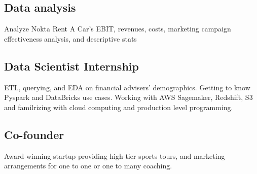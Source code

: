 \documentclass[letter,10pt]{article}
\begin{document}
\subsection{{Data analysis}}
\justify{}
\begin{zitemize}
\item Analyze Nokta Rent A Car's EBIT, revenues, costs, marketing campaign effectiveness analysis, and descriptive stats
\end{zitemize}

\vspace{10 pt}

\subsection{Data Scientist Internship}
\begin{zitemize}
\item ETL, querying, and EDA on financial advisers' demographics. Getting to know Pyspark and DataBricks use cases. Working with AWS Sagemaker, Redshift, S3 and familrizing with cloud computing and production level programming.
\end{zitemize}


\subsection{Co-founder}
\begin{zitemize}
\item Award-winning startup providing high-tier sports tours, and marketing arrangements for one to one or one to many coaching.
\end{zitemize}
\end{document}
